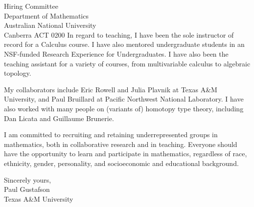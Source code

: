 \documentclass[11pt]{letter} %
\begin{document}
\begin{letter}{Hiring Committee \\
Department of Mathematics \\
Australian National University \\
Canberra ACT 0200}
In regard to teaching, I have been the sole instructor of record for a Calculus course.  I have also mentored undergraduate students in an NSF-funded Research Experience for Undergraduates.  I have also been the teaching assistant for a variety of courses, from multivariable calculus to algebraic topology.

My collaborators include Eric Rowell and Julia Plavnik at Texas A\&M University, and Paul Bruillard at Pacific Northwest National Laboratory.  I have also worked with many people on (variants of) homotopy type theory, including Dan Licata and Guillaume Brunerie.

I am committed to recruiting and retaining underrepresented groups in mathematics, both in collaborative research and in teaching. Everyone should have the opportunity to learn and participate in mathematics, regardless of race, ethnicity, gender, personality, and socioeconomic and educational background.


\closing{Sincerely yours,\\ Paul Gustafson \\ Texas A\&M University}




\end{letter}
\end{document}
